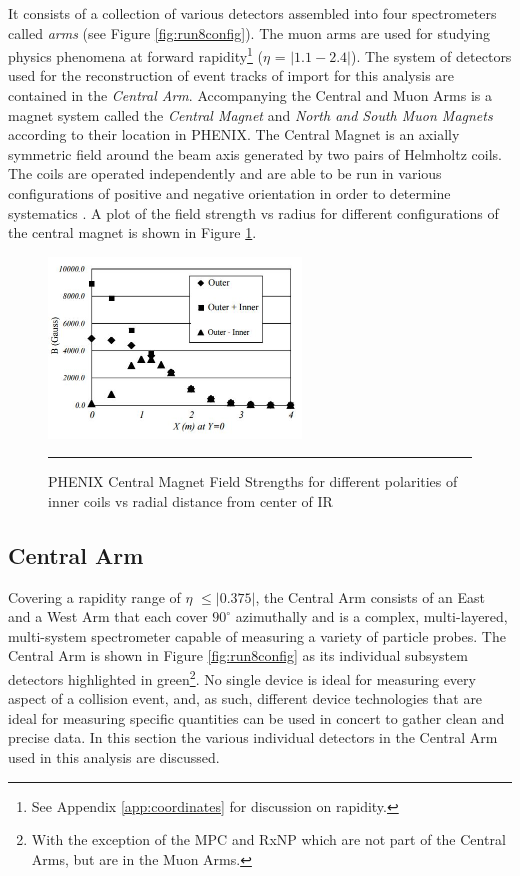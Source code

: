 It consists of a collection of various detectors assembled into four spectrometers called \textit{arms} (see Figure \ref{fig:run8config}). The muon arms are used for studying physics phenomena at forward rapidity\footnote{See Appendix \ref{app:coordinates} for discussion on rapidity.} ($\eta$ = $|1.1-2.4|$). \citep{rapidityref} The system of detectors used for the reconstruction of event tracks of import for this analysis are contained in the \textit{Central Arm}. Accompanying the Central and Muon Arms is a magnet system called the \textit{Central Magnet} and \textit{North and South Muon Magnets} according to their location in PHENIX. The Central Magnet is an axially symmetric field around the beam axis generated by two pairs of Helmholtz coils. The coils are operated independently and are able to be run in various configurations of positive and negative orientation in order to determine systematics \citep{rolnickthesis}. A plot of the field strength vs radius for different configurations of the central magnet is shown in Figure \ref{fig:centralmagnet}.

\begin{figure}[htbp]
  \centering
    \includegraphics[width=0.6\textwidth]{Figures/phenixcentralmagnet.JPG}
      \rule{35em}{0.5pt}
  \caption[PHENIX Central Magnet Field Strengths.]{PHENIX Central Magnet Field Strengths for different polarities of inner coils vs radial distance from center of IR}
  \label{fig:centralmagnet}

\end{figure}
\subsection{Central Arm}
Covering a rapidity range of $\eta$ $\leq|0.375|$, the Central Arm consists of an East and a West Arm that each cover $90^{\circ}$ azimuthally \citep{EMCfocus} and is a complex, multi-layered, multi-system spectrometer capable of measuring a variety of particle probes. The Central Arm is shown in Figure \ref{fig:run8config} as its individual subsystem detectors highlighted in green\footnote{With the exception of the MPC and RxNP which are not part of the Central Arms, but are in the Muon Arms.}. No single device is ideal for measuring every aspect of a collision event, and, as such, different device technologies that are ideal for measuring specific quantities can be used in concert to gather clean and precise data. In this section the various individual detectors in the Central Arm used in this analysis are discussed.


